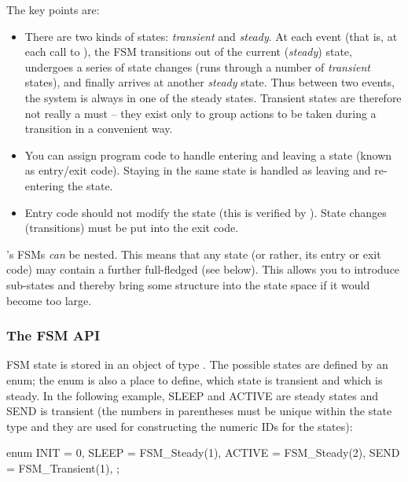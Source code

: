 The key points are:
\begin{itemize}
\item{There are two kinds of states:
    \textit{transient} and
    \textit{steady}. At each event (that is, at
    each call to ), the FSM transitions out of
    the current (\textit{steady}) state, undergoes a series of state
    changes (runs through a number of \textit{transient} states), and
    finally arrives at another \textit{steady} state. Thus between two
    events, the system is always in one of the steady states.
    Transient states are therefore not really a must -- they exist
    only to group actions to be taken during a transition in a
    convenient way.}
\item{You can assign program code to handle entering and leaving a state
    (known as entry/exit code).
    Staying in the same state is handled as leaving and re-entering
    the state.}
\item{Entry code should not modify the state (this is verified by
    {\opp}).  State changes (transitions) must be put into the exit
    code.}
\end{itemize}

{\opp}'s FSMs \textit{can} be nested. This means
that any state (or rather, its entry or exit code) may contain a
further full-fledged  (see below). This allows you
to introduce sub-states and thereby bring some structure into the
state space if it would become too large.


\subsubsection{The FSM API}


FSM state is stored in an object of type . The possible states
are defined by an enum; the enum is also a place to define, which
state is transient and which is steady. In the following example, SLEEP
and ACTIVE are steady states and SEND is transient (the numbers
in parentheses must be unique within the state type and they are used
for constructing the numeric IDs for the states):

\begin{cpp}
enum {
  INIT = 0,
  SLEEP = FSM_Steady(1),
  ACTIVE = FSM_Steady(2),
  SEND = FSM_Transient(1),
};
\end{cpp}



